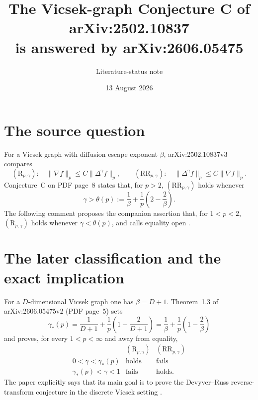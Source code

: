 \documentclass[11pt]{article}
\title{The Vicsek-graph Conjecture C of arXiv:2502.10837\\
is answered by arXiv:2606.05475}
\author{Literature-status note}
\date{13 August 2026}
\newcommand{\Riesz}{(\mathrm R_{p,\gamma})}
\newcommand{\Reverse}{(\mathrm {RR}_{p,\gamma})}
\begin{document}
\maketitle

\begin{center}
\end{center}

\section{The source question}

For a Vicsek graph with diffusion escape exponent $\beta$, arXiv:2502.10837v3
compares
\[
 \Riesz:\quad \|\nabla f\|_p\leq C\|\Delta^\gamma f\|_p,
 \qquad
 \Reverse:\quad \|\Delta^\gamma f\|_p\leq C\|\nabla f\|_p.
\]
Conjecture~C on PDF page~8 states that, for $p>2$, $\Reverse$ holds whenever
\begin{equation}\label{eq:theta}
 \gamma>\theta(p):=\frac1\beta+\frac1p\left(2-\frac2\beta\right).
\end{equation}
The following comment proposes the companion assertion that, for $1<p<2$,
$\Riesz$ holds whenever $\gamma<\theta(p)$, and calls equality open
\cite{Fen25}.

\section{The later classification and the exact implication}

For a $D$-dimensional Vicsek graph one has $\beta=D+1$.  Theorem~1.3 of
arXiv:2606.05475v2 (PDF page~5) sets
\begin{equation}\label{eq:star}
 \gamma_*(p)=\frac1{D+1}+\frac1p\left(1-\frac2{D+1}\right)
 =\frac1\beta+\frac1p\left(1-\frac2\beta\right)
\end{equation}
and proves, for every $1<p<\infty$ and away from equality,
\[
 \begin{array}{c|cc}
 &\Riesz&\Reverse\\ \hline
 0<\gamma<\gamma_*(p)&\text{holds}&\text{fails}\\
 \gamma_*(p)<\gamma<1&\text{fails}&\text{holds}.
 \end{array}
\]
The paper explicitly says that its main goal is to prove the Devyver--Russ
reverse-transform conjecture in the discrete Vicsek setting \cite{Fen26}.
\end{document}
